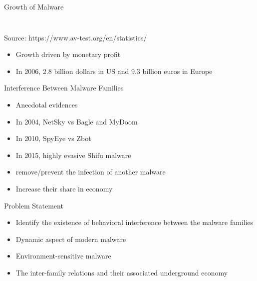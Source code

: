 \documentclass{beamer}
\begin{document}
\begin{frame}[plain,t]{Growth of Malware}
\begin{columns}
\begin{column}{5cm}
\begin{figure}[t]
\begin{center}
        \end{center}
      \end{figure}
    \end{column}
  \end{columns}
  \begin{center}
  \tiny Source: https://www.av-test.org/en/statistics/
  \end{center}
  \begin{itemize}
    \item Growth driven by monetary profit
    \item In 2006, 2.8 billion dollars in US and 9.3 billion euros in Europe
  \end{itemize}
\end{frame}
\begin{frame}[h]{Interference Between Malware Families}
  \begin{itemize}
    \item Anecdotal evidences
    \item In 2004, NetSky vs Bagle and MyDoom
    \item In 2010, SpyEye vs Zbot
    \item In 2015, highly evasive Shifu malware
    \item remove/prevent the infection of another malware
    \item Increase their share in economy
  \end{itemize}
\end{frame}
\begin{frame}[h]{Problem Statement}
\begin{itemize}
  \item Identify the existence of behavioral interference between the malware families
  \item Dynamic aspect of modern malware
  \item Environment-sensitive malware
  \item The inter-family relations and their associated underground economy
\end{itemize}
\end{frame}
\end{document}
